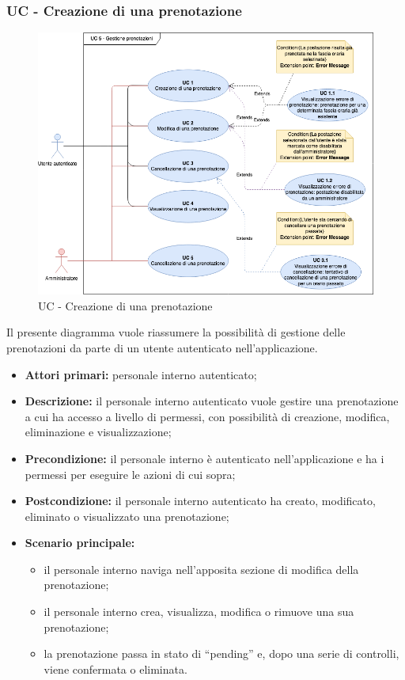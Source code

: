 \subsubsection{UC - Creazione di una prenotazione}

\begin{figure}[h]
  \centering
    \includegraphics[scale=0.5]{src/CasiDUso/Immagini/UC5.png}
  \caption{UC  - Creazione di una prenotazione}
\end{figure}

Il presente diagramma vuole riassumere la possibilità di gestione delle prenotazioni da parte di un utente autenticato nell’applicazione.

\begin{itemize}
\item \textbf{Attori primari:} personale interno autenticato;
\item \textbf{Descrizione:} il personale interno autenticato vuole gestire una prenotazione a cui ha accesso a livello di permessi, con possibilità di creazione, modifica, eliminazione e visualizzazione;
\item \textbf{Precondizione:} il personale interno è autenticato nell’applicazione e ha i permessi per eseguire le azioni di cui sopra;
\item \textbf{Postcondizione:} il personale interno autenticato ha creato, modificato, eliminato o visualizzato una prenotazione;
\item \textbf{Scenario principale:} 
	\begin{itemize}
		\item il personale interno naviga nell’apposita sezione di modifica della prenotazione;
		\item il personale interno crea, visualizza, modifica o rimuove una sua prenotazione;
		\item la prenotazione passa in stato di “pending” e, dopo una serie di controlli, viene confermata o eliminata.
	\end{itemize}
\end{itemize}

